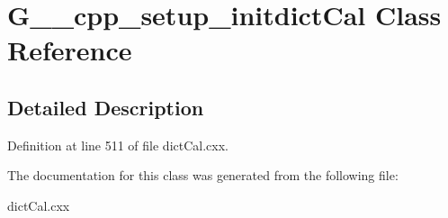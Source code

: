 \hypertarget{classG____cpp__setup__initdictCal}{
\section{G\_\-\_\-cpp\_\-setup\_\-initdictCal Class Reference}
\label{classG____cpp__setup__initdictCal}
}


\subsection{Detailed Description}


Definition at line 511 of file dictCal.cxx.



The documentation for this class was generated from the following file:\begin{DoxyCompactItemize}
\item 
dictCal.cxx\end{DoxyCompactItemize}

